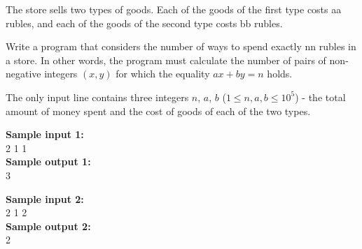 \documentclass[a4paper]{article}
\begin{document}
The store sells two types of goods. Each of the goods of the first type costs aa rubles, and each of the goods of the second type costs bb rubles.

Write a program that considers the number of ways to spend exactly nn rubles in a store. In other words, the program must calculate the number of pairs of non-negative integers $(x, y)$ for which the equality $ax + by = n$ holds.

The only input line contains three integers $n$, $a$, $b$ ($1 \le n, a, b \le 10^5$) - the total amount of money spent and the cost of goods of each of the two types.

\LINE

\noindent \textbf{Sample input 1:}\\
2 1 1\\

\noindent \textbf{Sample output 1:}\\
3

\SPACE

\noindent \textbf{Sample input 2:}\\
2 1 2\\

\noindent \textbf{Sample output 2:}\\
2
\end{document}
